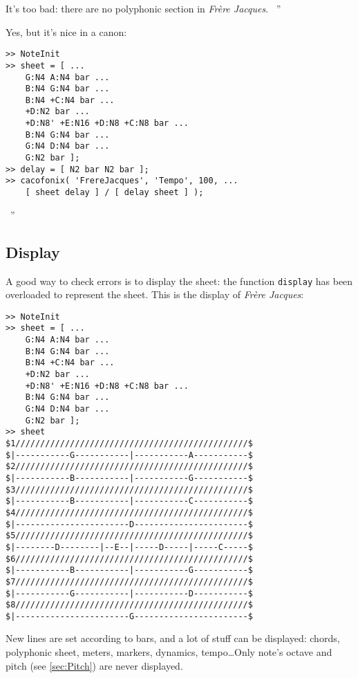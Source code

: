 \documentclass{article}
\newcommand{\frerejaques}{\emph{Fr\`ere Jacques}\xspace}
\newenvironment{meenv}{ \par \noindent \makebox[6em][r]{ \textcolor{mecolor}{Me}: `` --~}}{~''}
\newenvironment{myselfenv}{ \par \noindent \makebox[6em][r]{ \textcolor{myselfcolor}{Myself}: `` --~}}{~''}
\begin{document}
\begin{meenv}%
It's too bad: there are no polyphonic section in \frerejaques.%
\end{meenv}
\begin{myselfenv}%
Yes, but it's nice in a canon:

\begin{lstlisting}
>> NoteInit
>> sheet = [ ...
	G:N4 A:N4 bar ...
	B:N4 G:N4 bar ...
	B:N4 +C:N4 bar ...
	+D:N2 bar ...
	+D:N8' +E:N16 +D:N8 +C:N8 bar ...
	B:N4 G:N4 bar ...
	G:N4 D:N4 bar ...
	G:N2 bar ];
>> delay = [ N2 bar N2 bar ];
>> cacofonix( 'FrereJacques', 'Tempo', 100, ...
	[ sheet delay ] / [ delay sheet ] );
\end{lstlisting}%
\end{myselfenv}

\subsection{Display}

A good way to check errors is to display the sheet: the function \lstinline!display! has been overloaded to represent the sheet. This is the display of \frerejaques:
\begin{lstlisting}
>> NoteInit
>> sheet = [ ...
	G:N4 A:N4 bar ...
	B:N4 G:N4 bar ...
	B:N4 +C:N4 bar ...
	+D:N2 bar ...
	+D:N8' +E:N16 +D:N8 +C:N8 bar ...
	B:N4 G:N4 bar ...
	G:N4 D:N4 bar ...
	G:N2 bar ];
>> sheet
$1///////////////////////////////////////////////$
$|-----------G-----------|-----------A-----------$
$2///////////////////////////////////////////////$
$|-----------B-----------|-----------G-----------$
$3///////////////////////////////////////////////$
$|-----------B-----------|-----------C-----------$
$4///////////////////////////////////////////////$
$|-----------------------D-----------------------$
$5///////////////////////////////////////////////$
$|--------D--------|--E--|-----D-----|-----C-----$
$6///////////////////////////////////////////////$
$|-----------B-----------|-----------G-----------$
$7///////////////////////////////////////////////$
$|-----------G-----------|-----------D-----------$
$8///////////////////////////////////////////////$
$|-----------------------G-----------------------$
\end{lstlisting}

New lines are set according to bars, and a lot of stuff can be displayed: chords, polyphonic sheet, meters, markers, dynamics, tempo\dots Only note's octave and pitch (see \ref{sec:Pitch}) are never displayed.
\end{document}
